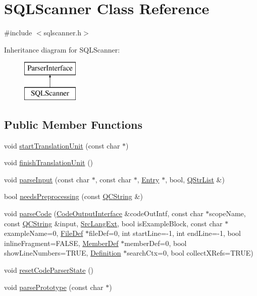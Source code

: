\hypertarget{class_s_q_l_scanner}{}\section{S\+Q\+L\+Scanner Class Reference}
\label{class_s_q_l_scanner}


{\ttfamily \#include $<$sqlscanner.\+h$>$}

Inheritance diagram for S\+Q\+L\+Scanner\+:\begin{figure}[H]
\begin{center}
\leavevmode
\includegraphics[height=2.000000cm]{class_s_q_l_scanner}
\end{center}
\end{figure}
\subsection*{Public Member Functions}
\begin{DoxyCompactItemize}
\item 
void \mbox{\hyperlink{class_s_q_l_scanner_acc0fa16e000516b6e36e563bb2fd9b18}{start\+Translation\+Unit}} (const char $\ast$)
\item 
void \mbox{\hyperlink{class_s_q_l_scanner_a523d522ed6726915191b5a5ae9584c92}{finish\+Translation\+Unit}} ()
\item 
void \mbox{\hyperlink{class_s_q_l_scanner_ace5de45254ddb10a6282bf626aea6994}{parse\+Input}} (const char $\ast$, const char $\ast$, \mbox{\hyperlink{class_entry}{Entry}} $\ast$, bool, \mbox{\hyperlink{class_q_str_list}{Q\+Str\+List}} \&)
\item 
bool \mbox{\hyperlink{class_s_q_l_scanner_a601b62fbb52bd81bbeb991ec2540915d}{needs\+Preprocessing}} (const \mbox{\hyperlink{class_q_c_string}{Q\+C\+String}} \&)
\item 
void \mbox{\hyperlink{class_s_q_l_scanner_addaa1e6904f2cbd0e490580ed40fd89d}{parse\+Code}} (\mbox{\hyperlink{class_code_output_interface}{Code\+Output\+Interface}} \&code\+Out\+Intf, const char $\ast$scope\+Name, const \mbox{\hyperlink{class_q_c_string}{Q\+C\+String}} \&input, \mbox{\hyperlink{types_8h_a9974623ce72fc23df5d64426b9178bf2}{Src\+Lang\+Ext}}, bool is\+Example\+Block, const char $\ast$example\+Name=0, \mbox{\hyperlink{class_file_def}{File\+Def}} $\ast$file\+Def=0, int start\+Line=-\/1, int end\+Line=-\/1, bool inline\+Fragment=F\+A\+L\+SE, \mbox{\hyperlink{class_member_def}{Member\+Def}} $\ast$member\+Def=0, bool show\+Line\+Numbers=T\+R\+UE, \mbox{\hyperlink{class_definition}{Definition}} $\ast$search\+Ctx=0, bool collect\+X\+Refs=T\+R\+UE)
\item 
void \mbox{\hyperlink{class_s_q_l_scanner_ad419869977f9e82f027bf07df2c31287}{reset\+Code\+Parser\+State}} ()
\item 
void \mbox{\hyperlink{class_s_q_l_scanner_ae86c2ea0733df595918fad083095e5b1}{parse\+Prototype}} (const char $\ast$)
\end{DoxyCompactItemize}


